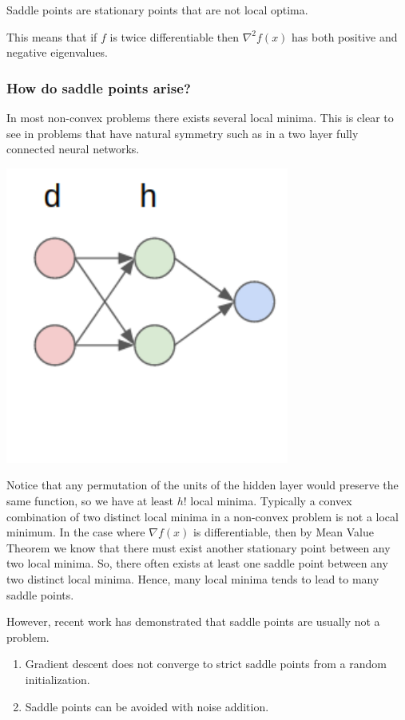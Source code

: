 \begin{definition}
Saddle points are stationary points that are not local optima.
\end{definition}

This means that if $f$ is twice differentiable then $\nabla^2 f(x)$ has both positive and negative eigenvalues.

\subsubsection{How do saddle points arise?}

In most non-convex problems there exists several local minima. This is clear to see in problems that have natural symmetry such as in a two layer fully connected neural networks. 
\begin{center}
\includegraphics[width=0.3\linewidth, height=0.3\linewidth]{figures/lecture_17_neural_network.pdf} 
\end{center} 
Notice that any permutation of the units of the hidden layer would
preserve the same function, so we have at least $h!$ local minima. Typically a
convex combination of two distinct local minima in a non-convex problem is not a
local minimum. In the case where $\nabla f(x)$ is differentiable, then by Mean
Value Theorem we know that there must exist another stationary point between any
two local minima. So, there often exists at least one saddle point between any
two distinct local minima. Hence, many local minima tends to lead to many saddle
points.

However, recent work has demonstrated that saddle points are usually not a problem.
\begin{enumerate}
    \item Gradient descent does not converge to strict saddle points from a random initialization. \cite{DBLP:journals/corr/GeHJY15}
    \item Saddle points can be avoided with noise addition. \cite{DBLP:journals/corr/abs-1710-07406}
\end{enumerate}
